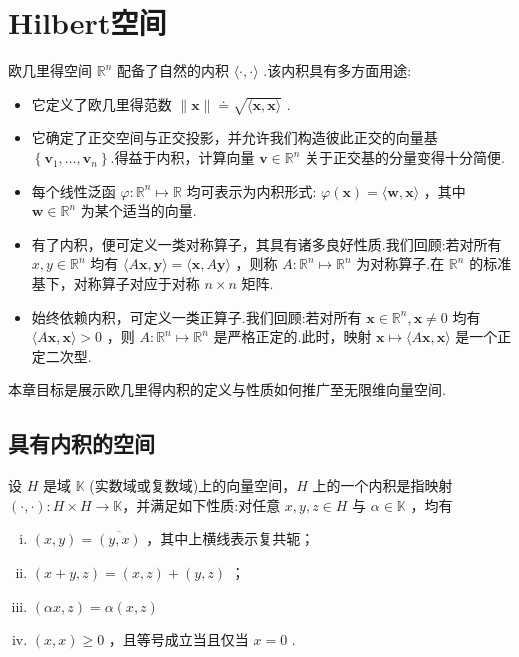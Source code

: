 \chapter{Hilbert空间}\vspace{-2em}

欧几里得空间 ${\mathbb{R}}^{n}$ 配备了自然的内积 $\langle  \cdot  , \cdot  \rangle$ .该内积具有多方面用途:

\begin{itemize}
\item 它定义了欧几里得范数 $\| \bm{x}\|  \doteq  \sqrt{\langle \bm{x},\bm{x}\rangle }$ .
\item 它确定了正交空间与正交投影，并允许我们构造彼此正交的向量基 $\left\{  {{\bm{v}}_{1},\ldots ,{\bm{v}}_{n}}\right\}$.得益于内积，计算向量 $\bm{v} \in  {\mathbb{R}}^{n}$ 关于正交基的分量变得十分简便.
\item 每个线性泛函 $\varphi  : {\mathbb{R}}^{n} \mapsto  \mathbb{R}$ 均可表示为内积形式: $\varphi \left( \bm{x}\right)  = \langle \bm{w},\bm{x}\rangle$ ，其中 $\bm{w} \in  {\mathbb{R}}^{n}$ 为某个适当的向量.
\item 有了内积，便可定义一类对称算子，其具有诸多良好性质.我们回顾:若对所有 $x,y \in  {\mathbb{R}}^{n}$ 均有 $\langle A\bm{x},\bm{y}\rangle  = \langle \bm{x},A\bm{y}\rangle$ ，则称 $A : {\mathbb{R}}^{n} \mapsto  {\mathbb{R}}^{n}$ 为对称算子.在 ${\mathbb{R}}^{n}$ 的标准基下，对称算子对应于对称 $n \times  n$ 矩阵.
\item 始终依赖内积，可定义一类正算子.我们回顾:若对所有 $\bm{x} \in  {\mathbb{R}}^{n},\bm{x} \neq  0$ 均有 $\langle A\bm{x},\bm{x}\rangle  > 0$ ，则 $A : {\mathbb{R}}^{n} \mapsto  {\mathbb{R}}^{n}$ 是严格正定的.此时，映射 $\bm{x} \mapsto  \langle A\bm{x},\bm{x}\rangle$ 是一个正定二次型.
\end{itemize}

本章目标是展示欧几里得内积的定义与性质如何推广至无限维向量空间.

\section{具有内积的空间}

\begin{definition}[内积空间]
    设 $H$ 是域 $\mathbb{K}$ (实数域或复数域)上的向量空间，$H$ 上的一个内积是指映射 $\left( {\cdot , \cdot  }\right):H\times H\to\mathbb{K}$，并满足如下性质:对任意 $x,y,z \in  H$ 与 $\alpha  \in  \mathbb{K}$ ，均有
    \begin{enumerate}[(i)]
        \item  $\left( {x,y}\right)  = \overline{\left( y,x\right) }$ ，其中上横线表示复共轭；
        \item $\left( {x + y,z}\right)  = \left( {x,z}\right)  + \left( {y,z}\right)$ ；
        \item $\left( {{\alpha x},z}\right)  = \alpha \left( {x,z}\right)$
        \item $\left( {x,x}\right)  \geq  0$ ，且等号成立当且仅当 $x = 0$ .
    \end{enumerate}
\end{definition}



